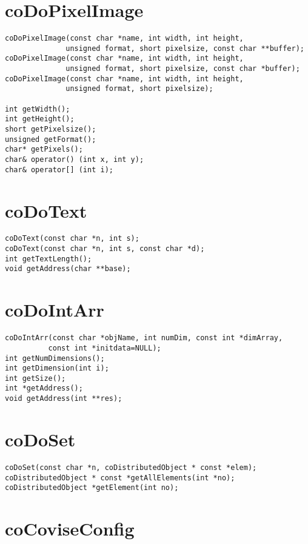 \section{coDoPixelImage}

\begin{verbatim}
coDoPixelImage(const char *name, int width, int height, 
              unsigned format, short pixelsize, const char **buffer);
coDoPixelImage(const char *name, int width, int height, 
              unsigned format, short pixelsize, const char *buffer);
coDoPixelImage(const char *name, int width, int height, 
              unsigned format, short pixelsize);
 
int getWidth();
int getHeight();
short getPixelsize();
unsigned getFormat();
char* getPixels(); 
char& operator() (int x, int y);
char& operator[] (int i);
\end{verbatim}


\section{coDoText}
 
\begin{verbatim}
coDoText(const char *n, int s);
coDoText(const char *n, int s, const char *d);
int getTextLength();
void getAddress(char **base);
\end{verbatim}


\section{coDoIntArr}

\begin{verbatim} 
coDoIntArr(const char *objName, int numDim, const int *dimArray,
          const int *initdata=NULL);
int getNumDimensions();
int getDimension(int i);
int getSize();
int *getAddress();
void getAddress(int **res);
\end{verbatim}


\section{coDoSet}

\begin{verbatim} 
coDoSet(const char *n, coDistributedObject * const *elem);
coDistributedObject * const *getAllElements(int *no);
coDistributedObject *getElement(int no);
\end{verbatim}


\section{coCoviseConfig}

